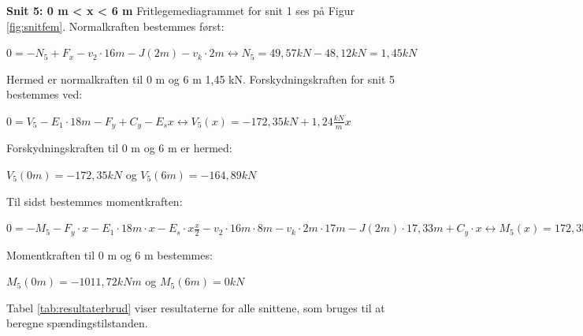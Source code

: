 \textbf{Snit 5: 0 m < x < 6 m}
\newline
Fritlegemediagrammet for snit 1 ses på Figur \ref{fig:snitfem}.
\newline
\newline
Normalkraften bestemmes først:
\begin{center}
	$0 = -N_5 + F_x - v_2 \cdot 16m - J(2m) - v_k \cdot 2m \leftrightarrow N_5 = 49,\!57 kN - 48,\!12 kN = 1,\!45 kN$
\end{center}

Hermed er normalkraften til 0 m og 6 m 1,45 kN. 
\newline
\newline
Forskydningskraften for snit 5 bestemmes ved:
\begin{center}
	$0 = V_5 - E_1 \cdot 18 m - F_y + C_y - E_s x \leftrightarrow V_5(x) = -172,\!35 kN + 1,\!24 \frac{kN}{m}x$
\end{center}

Forskydningskraften til 0 m og 6 m er hermed:
\begin{center}
	$V_5(0m) = -172,\!35 kN$ og $V_5(6m) = -164,\!89 kN$
\end{center}

Til sidst bestemmes momentkraften:
\begin{center}
	$0 = -M_5 - F_y \cdot x - E_1 \cdot 18 m \cdot x - E_s \cdot x \frac{x}{2} - v_2 \cdot 16 m \cdot 8 m - v_k \cdot 2 m \cdot 17 m - J(2m) \cdot 17,\!33 m + C_y \cdot x \leftrightarrow M_5(x) = 172,\!35 kN \cdot x - 0,\!62 \frac{kN}{m} \cdot x^2 -1011,\!72 kNm$
\end{center}

Momentkraften til 0 m og 6 m bestemmes:
\begin{center}
	$M_5(0m) = -1011,\!72 kNm$ og $M_5(6m) = 0 kN$
\end{center}

Tabel \ref{tab:resultaterbrud} viser resultaterne for alle snittene, som bruges til at beregne spændingstilstanden. 

